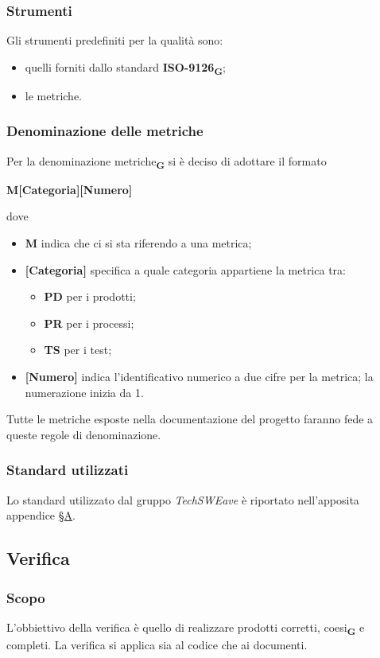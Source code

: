 \subsubsection{Strumenti}
Gli strumenti predefiniti per la qualità sono:
\begin{itemize}
    \item quelli forniti dallo standard \textbf{ISO-9126}\textsubscript{\textbf{G}};
    \item le metriche.
\end{itemize}
\subsubsection{Denominazione delle metriche}
Per la denominazione metriche\textsubscript{\textbf{G}} si è deciso di adottare il formato
\begin{center}
    \textbf{M[Categoria][Numero]}
\end{center}
dove
\begin{itemize}
    \item \textbf{M} indica che ci si sta riferendo a una metrica;
    \item \textbf{[Categoria]} specifica a quale categoria appartiene la metrica tra:\begin{itemize}
              \item \textbf{PD} per i prodotti;
              \item \textbf{PR} per i processi;
              \item \textbf{TS} per i test;
          \end{itemize}
    \item \textbf{[Numero]} indica l'identificativo numerico a due cifre per la metrica; la numerazione inizia da 1.
\end{itemize}
Tutte le metriche esposte nella documentazione del progetto faranno fede a queste regole di denominazione.
\subsubsection{Standard utilizzati}
Lo standard utilizzato dal gruppo \textit{TechSWEave} è riportato nell'apposita appendice \hyperref[sec:A]{§A}.
\subsection{Verifica}
\subsubsection{Scopo}
L'obbiettivo della verifica è quello di realizzare prodotti corretti, coesi\textsubscript{\textbf{G}} e completi. La verifica si applica sia al codice che ai documenti.

